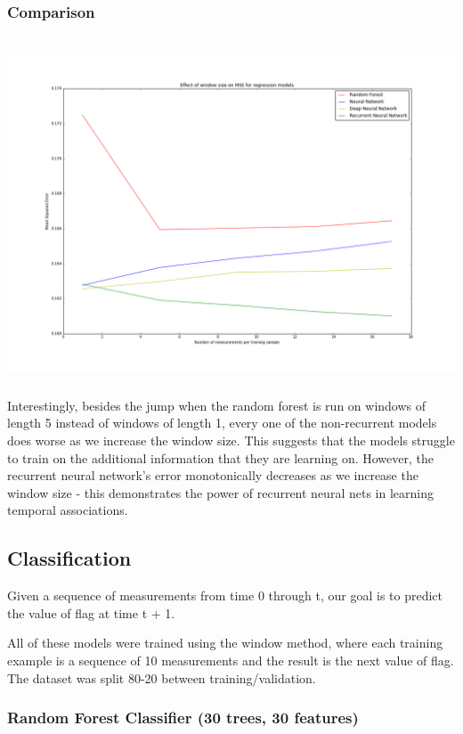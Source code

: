 \documentclass[12pt,a4paper]{article}
\begin{document}
\subsubsection{Comparison}
\includegraphics[height=400px, width=1.1\textwidth]{len_sequence_v_MSE}
Interestingly, besides the jump when the random forest is run on windows of length 5 instead of windows of length 1, every one of the non-recurrent models does worse as we increase the window size.  This suggests that the models struggle to train on the additional information that they are learning on.  However, the recurrent neural network's error monotonically decreases as we increase the window size - this demonstrates the power of recurrent neural nets in learning temporal associations.  

\subsection{Classification}
Given a sequence of measurements from time 0 through t, our goal is to predict the value of flag at time t + 1.  

All of these models were trained using the window method, where each training example is a sequence of 10 measurements and the result is the next value of flag.  The dataset was split 80-20 between training/validation.
\subsubsection{Random Forest Classifier (30 trees, 30 features)}
\end{document}
